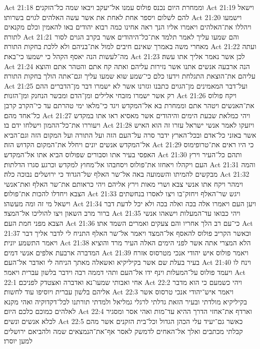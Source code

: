 Act 21:18  וממחרת היום נכנס פולוס עמנו אל־יעקב ויבאו שמה כל־הזקנים׃
Act 21:19  וישאל להם לשלום ויספר אחת לאחת את אשר עשה האלהים לגוים בשרותו׃
Act 21:20  וישמעו ויהללו את־האלהים ויאמרו אליו הנך ראה אחינו כמה רבוא יהודים באו להאמין וכלם מקנאים לתורה׃
Act 21:21  והם שמעו עליך לאמר תלמד את־כל־היהודים אשר בקרב הגוים לסור מאחרי משה באמרך שאינם חיבים למול את־בניהם ולא ללכת בחקות התורה׃
Act 21:22  ועתה מה־לעשות הנה יאסף הקהל כי ישמעו כי־באת׃
Act 21:23  לכן אשר נאמר אליך אתו עשה׃
Act 21:24  הנה ארבעה אנשים אתנו אשר נזירות עליהם ואתה קח אתם והטהר אתם והוצא עליהם את־הוצאת התגלחת וידעו כלם כי־שמע שוא שמעו עליך וגם־אתה הולך בחקות התורה׃
Act 21:25  ועל־דבר המאמינים מן־הגוים כתבנו וגזרנו אשר לא ישמרו דבר מן־הדברים ההם רק אשר ישמרו מזבחי אלילים ומן־הדם ומבשר הנחנק ומן־הזנות׃
Act 21:26  ויקח פולוס את־האנשים ויטהר אתם וממחרת בא אל־המקדש ויגד כי־מלאו ימי טהרתם עד כי־הקרב קרבן כל־אחד מהם׃
Act 21:27  ויהי כמלאת שבעת הימים והיהודים אשר מאסיא ראו אתו במקדש ויעוררו את־כל־ההמון וישלחו ידם בו׃
Act 21:28  ויזעקו לאמר אנשי ישראל עזרו זה הוא האיש אשר באזני כל־אדם ובכל־הארץ ידבר סרה על־העם הזה ועל התורה ועל המקום הזה וגם־הביא אל־המקדש אנשים יונים ויחלל את־המקום הקדוש הזה׃
Act 21:29  כי היו ראים את־טרופימוס האפסי בעיר אתו וסבורים שפולוס הביא אתו אל־המקדש׃
Act 21:30  ותהם כל־העיר וירץ העם ויקהלו ויאחזו את־פולוס ויסחבהו אל־מחוץ למקדש וכרגע סגרו הדלתות׃
Act 21:31  והמה מבקשים להמיתו והשמועה באה אל־שר האלף של־הגדוד כי ירושלים נבוכה כלה׃
Act 21:32  וימהר ויקח אתו אנשי צבא ושרי מאות וירץ אליהם ויהי כראותם את־שר האלף ואת־אנשי הצבא ויחדלו להכות את־פולוס׃
Act 21:33  ויגש שר־האלף ויחזק־בו ויצו לאסרו בנחשתים וישאל מי זה ומה מעשהו׃
Act 21:34  ויען העם ויאמרו אלה בכה ואלה בכה ולא יכל לדעת דבר ברור מרב השאון ויצו להוליכו אל־המצד׃
Act 21:35  ויהי כבואו עד־המעלות וישאהו אנשי הצבא מפני חמת העם׃
Act 21:36  כי־עם רב הלך אחריו והם צעקים ואמרים השמד אתו׃
Act 21:37  וכאשר הקריב פולוס להאסף אל־המצד ויאמר אל־שר האלף התניח לי לדבר אליך דבר ויאמר התשמע יונית׃
Act 21:38  הלא המצרי אתה אשר לפני הימים האלה העיר מרד והוציא המדברה ארבעת אלפים אנשי דמים׃
Act 21:39  ויאמר פולוס איש יהודי אנכי מטרסוס אזרח בעיר בעלת שם אשר בקיליקיא ואשאלה מאתך הניחה לי ואדבר אל־העם׃
Act 21:40  וינח לו ויעמד פולוס על־המעלות וינף ידו אל־העם ותהי דממה רבה וידבר בלשון עברית ויאמר׃
Act 22:1  אחי ואבותי שמעו־נא ואדברה ואצטדק לפניכם׃
Act 22:2  ויהי כשמעם כי הוא מדבר אליהם בלשון עברית ויוסיפו עוד לחשות׃
Act 22:3  ויאמר איש־יהודי אנכי טרסוס אשר בקיליקיא מולדתי ובעיר הזאת גדלתי לרגלי גמליאל ולמדתי תורתנו לכל־דקדוקיה ואהי מקנא לאלהים כמוכם כלכם היום׃
Act 22:4  וארדף את־אחזי הדרך ההיא עד־מות ואהי אסר ומסגיר לכלא אנשים ונשים׃
Act 22:5  כאשר גם־יעיד עלי הכהן הגדול וכל־בית הזקנים אשר מהם קבלתי מכתבים ואלך אל־האחים לדמשק לאסר אף־את־הנמצאים שמה ולהביאם ירושלים למען יוסרו׃
